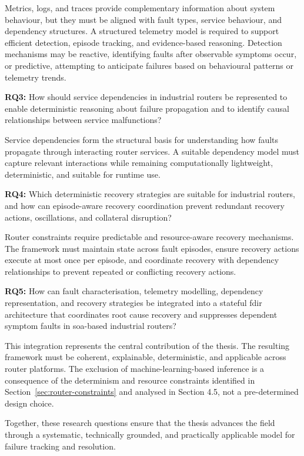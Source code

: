 Metrics, logs, and traces provide complementary information about system behaviour, but they must be aligned with fault types, service behaviour, and dependency structures. A structured telemetry model is required to support efficient detection, episode tracking, and evidence-based reasoning. Detection mechanisms may be reactive, identifying faults after observable symptoms occur, or predictive, attempting to anticipate failures based on behavioural patterns or telemetry trends.

\textbf{RQ3:} How should service dependencies in industrial routers be represented to enable deterministic reasoning about failure propagation and to identify causal relationships between service malfunctions?

Service dependencies form the structural basis for understanding how faults propagate through interacting router services. A suitable dependency model must capture relevant interactions while remaining computationally lightweight, deterministic, and suitable for runtime use.

\textbf{RQ4:} Which deterministic recovery strategies are suitable for industrial routers, and how can episode-aware recovery coordination prevent redundant recovery actions, oscillations, and collateral disruption?

Router constraints require predictable and resource-aware recovery mechanisms. The framework must maintain state across fault episodes, ensure recovery actions execute at most once per episode, and coordinate recovery with dependency relationships to prevent repeated or conflicting recovery actions.

\textbf{RQ5:} How can fault characterisation, telemetry modelling, dependency representation, and recovery strategies be integrated into a stateful \gls{fdir} architecture that coordinates root cause recovery and suppresses dependent symptom faults in \gls{soa}-based industrial routers?

This integration represents the central contribution of the thesis. The resulting framework must be coherent, explainable, deterministic, and applicable across router platforms. The exclusion of machine-learning-based inference is a consequence of the determinism and resource constraints identified in Section~\ref{sec:router-constraints} and analysed in Section 4.5, not a pre-determined design choice.

Together, these research questions ensure that the thesis advances the field through a systematic, technically grounded, and practically applicable model for failure tracking and resolution.

